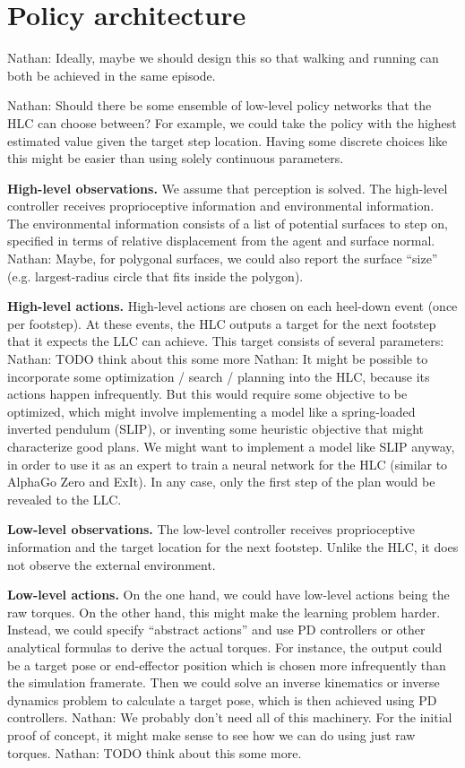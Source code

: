 \documentclass[a4paper]{article}
\newcommand{\nhatch}[1]{{\leavevmode\color{blue} Nathan: #1}}
\begin{document}
\section{Policy architecture}

\nhatch{Ideally, maybe we should design this so that walking and running can both be achieved in the same episode.}

\nhatch{Should there be some ensemble of low-level policy networks that the HLC can choose between?
For example, we could take the policy with the highest estimated value given the target step location.
Having some discrete choices like this might be easier than using solely continuous parameters.}

\textbf{High-level observations.}
We assume that perception is solved.
The high-level controller receives proprioceptive information and environmental information.
The environmental information consists of a list of potential surfaces to step on, specified in terms of relative displacement from the agent and surface normal.
\nhatch{Maybe, for polygonal surfaces, we could also report the surface ``size'' (e.g. largest-radius circle that fits inside the polygon).}

\textbf{High-level actions.}
High-level actions are chosen on each heel-down event (once per footstep).
At these events, the HLC outputs a target for the next footstep that it expects the LLC can achieve.
This target consists of several parameters: \nhatch{TODO think about this some more}
\nhatch{It might be possible to incorporate some optimization / search / planning into the HLC, because its actions happen infrequently.
But this would require some objective to be optimized, which might involve implementing a model like a spring-loaded inverted pendulum (SLIP), or inventing some heuristic objective that might characterize good plans.
We might want to implement a model like SLIP anyway, in order to use it as an expert to train a neural network for the HLC (similar to AlphaGo Zero and ExIt).
In any case, only the first step of the plan would be revealed to the LLC.}

\textbf{Low-level observations.}
The low-level controller receives proprioceptive information and the target location for the next footstep.
Unlike the HLC, it does not observe the external environment.

\textbf{Low-level actions.}
On the one hand, we could have low-level actions being the raw torques.
On the other hand, this might make the learning problem harder.
Instead, we could specify ``abstract actions'' and use PD controllers or other analytical formulas to derive the actual torques.
For instance, the output could be a target pose or end-effector position which is chosen more infrequently than the simulation framerate.
Then we could solve an inverse kinematics or inverse dynamics problem to calculate a target pose, which is then achieved using PD controllers.
\nhatch{We probably don't need all of this machinery.
For the initial proof of concept, it might make sense to see how we can do using just raw torques.}
\nhatch{TODO think about this some more.}
\end{document}
